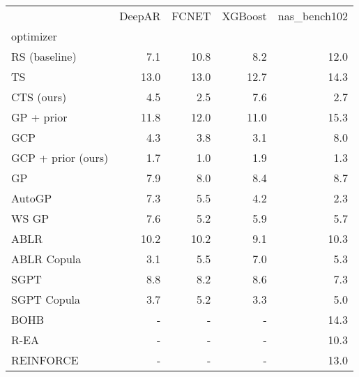 \begin{tabular}{lrrrr}
\toprule
{} &  DeepAR &  FCNET &  XGBoost &  nas\_bench102 \\
optimizer          &         &        &          &               \\
\midrule
RS (baseline)      &     7.1 &   10.8 &      8.2 &          12.0 \\
TS                 &    13.0 &   13.0 &     12.7 &          14.3 \\
CTS (ours)         &     4.5 &    2.5 &      7.6 &           2.7 \\
GP + prior         &    11.8 &   12.0 &     11.0 &          15.3 \\
GCP                &     4.3 &    3.8 &      3.1 &           8.0 \\
GCP + prior (ours) &     1.7 &    1.0 &      1.9 &           1.3 \\
GP                 &     7.9 &    8.0 &      8.4 &           8.7 \\
AutoGP             &     7.3 &    5.5 &      4.2 &           2.3 \\
WS GP              &     7.6 &    5.2 &      5.9 &           5.7 \\
ABLR               &    10.2 &   10.2 &      9.1 &          10.3 \\
ABLR Copula        &     3.1 &    5.5 &      7.0 &           5.3 \\
SGPT               &     8.8 &    8.2 &      8.6 &           7.3 \\
SGPT Copula        &     3.7 &    5.2 &      3.3 &           5.0 \\
BOHB               &       - &      - &        - &          14.3 \\
R-EA               &       - &      - &        - &          10.3 \\
REINFORCE          &       - &      - &        - &          13.0 \\
\bottomrule
\end{tabular}
